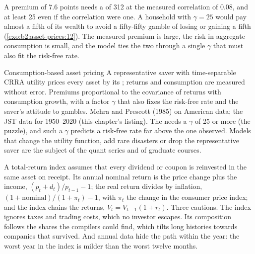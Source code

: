 \label{lst:b2:asset-prices:puzzle}

\label{out:b2:asset-prices:puzzle}

A premium of 7.6 points needs a  of 312 at the measured
correlation of 0.08, and at least 25 even if the correlation were one. A household with $\gamma = 25$
would pay almost a fifth of its wealth to avoid a fifty-fifty gamble of losing or gaining a fifth
(\cref{exo:b2:asset-prices:12}). The measured premium is large, the risk in aggregate consumption is
small, and the model ties the two through a single $\gamma$ that must also fit the risk-free rate.

\begin{model}{Consumption-based asset pricing}
\assumes A representative saver with time-separable CRRA utility prices every asset by its ; returns and consumption are measured without error.
\predicts Premiums proportional to the covariance of returns with consumption growth, with a factor
$\gamma$ that also fixes the risk-free rate and the saver's attitude to gambles.
\tested Mehra and Prescott (1985) on American data; the JST data for 1950--2020 (this chapter's
listing).
\breaks The  needs a $\gamma$ of 25 or more (the  puzzle), and such a
$\gamma$ predicts a risk-free rate far above the one observed. Models that change the utility
function, add rare disasters or drop the representative saver are the subject of the quant series and
of graduate courses.
\end{model}

\begin{measure}
A total-return index assumes that every dividend or coupon is reinvested in the same asset on receipt.
Its annual nominal return is the price change plus the income, $(p_t + d_t)/p_{t-1} - 1$; the real
return divides by inflation, $(1 + \text{nominal})/(1 + \pi_t) - 1$, with $\pi_t$ the change in the
consumer price index; and the index chains the returns, $V_t = V_{t-1}(1 + r_t)$. Three cautions. The
index ignores taxes and trading costs, which no investor escapes. Its composition follows the shares
the compilers could find, which tilts long histories towards companies that survived. And annual data
hide the path within the year: the worst year in the index is milder than the worst twelve months.
\end{measure}

